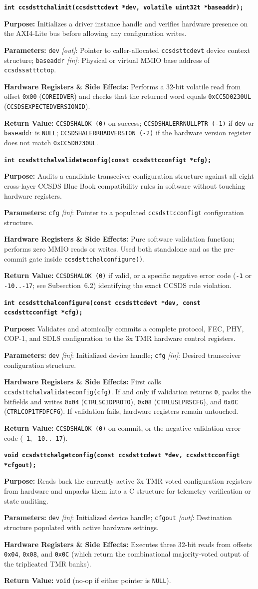 \documentclass[10pt,a4paper]{article}
\renewcommand{\_}{\origunderscore\penalty0\hskip0pt\relax}
\newcommand{\apifunc}[5]{%
  \par\vspace{5pt}\noindent\colorbox{codebg}{%
    \parbox{\dimexpr\textwidth-2\fboxsep\relax}{%
      \vspace{3pt}\texttt{\bfseries\color{navy}#1}\vspace{3pt}%
    }%
  }\par\nopagebreak\vspace{2pt}%
  \noindent\textbf{Purpose:} #2\par\nopagebreak
  \noindent\textbf{Parameters:} #3\par\nopagebreak
  \noindent\textbf{Hardware Registers \& Side Effects:} #4\par\nopagebreak
  \noindent\textbf{Return Value:} #5\par\vspace{3pt}%
}
\numberwithin{table}{section}
\numberwithin{figure}{section}
\numberwithin{equation}{section}
\begin{document}
\apifunc{int ccsds\_ttc\_hal\_init(ccsds\_ttc\_dev\_t *dev, volatile uint32\_t *base\_addr);}%
{Initializes a driver instance handle and verifies hardware presence on the AXI4-Lite bus before allowing any configuration writes.}%
{\texttt{dev} \emph{[out]}: Pointer to caller-allocated \texttt{ccsds\_ttc\_dev\_t} device context structure; \texttt{base\_addr} \emph{[in]}: Physical or virtual MMIO base address of \texttt{ccsds\_sat\_ttc\_top}.}%
{Performs a 32-bit volatile read from offset \texttt{0x00} (\texttt{CORE\_ID\_VER}) and checks that the returned word equals \texttt{0xCC5D0230UL} (\texttt{CCSDS\_EXPECTED\_VERSION\_ID}).}%
{\texttt{CCSDS\_HAL\_OK (0)} on success; \texttt{CCSDS\_HAL\_ERR\_NULL\_PTR (-1)} if \texttt{dev} or \texttt{base\_addr} is \texttt{NULL}; \texttt{CCSDS\_HAL\_ERR\_BAD\_VERSION (-2)} if the hardware version register does not match \texttt{0xCC5D0230UL}.}

\apifunc{int ccsds\_ttc\_hal\_validate\_config(const ccsds\_ttc\_config\_t *cfg);}%
{Audits a candidate transceiver configuration structure against all eight cross-layer CCSDS Blue Book compatibility rules in software without touching hardware registers.}%
{\texttt{cfg} \emph{[in]}: Pointer to a populated \texttt{ccsds\_ttc\_config\_t} configuration structure.}%
{Pure software validation function; performs zero MMIO reads or writes. Used both standalone and as the pre-commit gate inside \texttt{ccsds\_ttc\_hal\_configure()}.}%
{\texttt{CCSDS\_HAL\_OK (0)} if valid, or a specific negative error code (\texttt{-1} or \texttt{-10..-17}; see Subsection~6.2) identifying the exact CCSDS rule violation.}

\apifunc{int ccsds\_ttc\_hal\_configure(const ccsds\_ttc\_dev\_t *dev, const ccsds\_ttc\_config\_t *cfg);}%
{Validates and atomically commits a complete protocol, FEC, PHY, COP-1, and SDLS configuration to the 3x TMR hardware control registers.}%
{\texttt{dev} \emph{[in]}: Initialized device handle; \texttt{cfg} \emph{[in]}: Desired transceiver configuration structure.}%
{First calls \texttt{ccsds\_ttc\_hal\_validate\_config(cfg)}. If and only if validation returns \texttt{0}, packs the bitfields and writes \texttt{0x04} (\texttt{CTRL\_SCID\_PROTO}), \texttt{0x08} (\texttt{CTRL\_USLP\_RS\_CFG}), and \texttt{0x0C} (\texttt{CTRL\_COP1\_TFDF\_CFG}). If validation fails, hardware registers remain untouched.}%
{\texttt{CCSDS\_HAL\_OK (0)} on commit, or the negative validation error code (\texttt{-1}, \texttt{-10..-17}).}

\apifunc{void ccsds\_ttc\_hal\_get\_config(const ccsds\_ttc\_dev\_t *dev, ccsds\_ttc\_config\_t *cfg\_out);}%
{Reads back the currently active 3x TMR voted configuration registers from hardware and unpacks them into a C structure for telemetry verification or state auditing.}%
{\texttt{dev} \emph{[in]}: Initialized device handle; \texttt{cfg\_out} \emph{[out]}: Destination structure populated with active hardware settings.}%
{Executes three 32-bit reads from offsets \texttt{0x04}, \texttt{0x08}, and \texttt{0x0C} (which return the combinational majority-voted output of the triplicated TMR banks).}%
{\texttt{void} (no-op if either pointer is \texttt{NULL}).}
\end{document}
